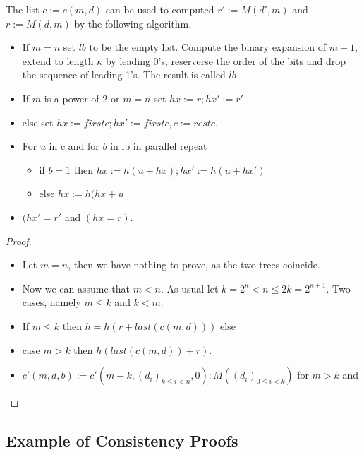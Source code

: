 \begin{theorem}
The list \(c := c(m,d)\) can be used to computed \(r' := M(d',m)\) and \(r := M(d,m)\) by the following
algorithm.
\begin{itemize}
\item If \(m=n\) set \(lb\) to be the empty list. Compute the binary expansion of \(m-1\), extend to length \(\kappa\) by leading 0's, 
reserverse the order of the bits and drop the sequence of leading 1's. The result
is called \(lb\)
\item If \(m\) is a power of 2 or \(m = n\) set \(hx := r; hx' := r'\) 
\item else set \(hx := first c; hx' := first c, c := rest c\).
\item For \(u\) in c and for \(b\) in lb in parallel repeat
	\begin{itemize}
		\item if \(b=1\) then \(hx := h(u+hx); hx' := h(u+hx')\)
		\item else \(hx := h(hx+u\)
	\end{itemize}
\item \((hx' = r'\) and \((hx = r)\).
\end{itemize}
\end{theorem}
\begin{proof}
\begin{itemize}
\item
Let \(m = n\), then we have nothing to prove, as the two trees coincide. 
\item
Now we can assume that \(m < n\). As usual let \(k = 2^\kappa < n \le 2k = 2^{\kappa+1}\).
Two cases, namely \(m \le k\) and \(k < m\).
\item
If \(m \le k\) then \(h = h(r + last( c(m,d) ) ) \) else
\item 
case \(m > k\) then \(h( last( c(m,d) ) + r)\).

\item \(c'(m,d,b) := c'(m-k, (d_i)_{k \le i < n},0) : M( (d_i)_{0 \le i < k})\) for \(m > k\) and


\end{itemize}
\end{proof}


\subsection{Example of Consistency Proofs}

